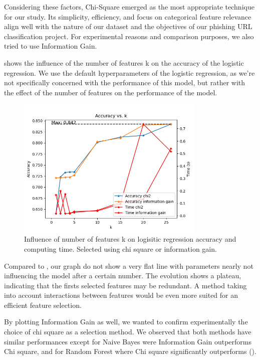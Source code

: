 \documentclass{article}
\begin{document}
    Considering these factors, Chi-Square emerged as the most appropriate technique for our study.
    Its simplicity, efficiency, and focus on categorical feature relevance align well with the nature of our dataset and the objectives of our phishing URL classification project.
    For experimental reasons and comparison purposes, we also tried to use Information Gain.

     shows the influence of the number of features k on the accuracy of the logistic regression.
    We use the default hyperparameters of the logistic regression, as we're not specifically concerned with the performance of this model, but rather with the effect of the number of features on the performance of the model.

    \begin{figure}[H]
        \centering
        \includegraphics[width=0.8\textwidth]{report_img/k_search/logistic_regression}
        \caption{Influence of number of features k on logisitic regression accuracy and computing time. Selected using chi square or information gain.}
        \label{fig:k_search_logistic_regression}
    \end{figure}

    Compared to , our graph do not show a very flat line with parameters nearly not influencing the model after a certain number.
    The evolution shows a plateau, indicating that the firsts selected features may be redundant.
    A method taking into account interactions between features would be even more suited for an efficient feature selection.

    By plotting Information Gain as well, we wanted to confirm experimentally the choice of chi square as a selection method.
    We observed that both methods have similar performances except for Naive Bayes were Information Gain outperforms Chi square, and for Random Forest where Chi square significantly outperforms ().
\end{document}
